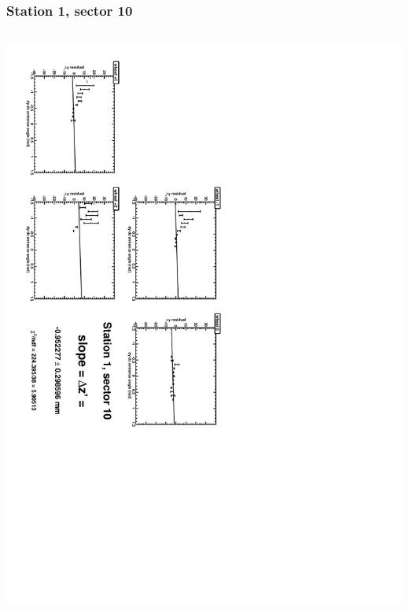 \documentclass[compress]{beamer}
\begin{document}
\begin{frame}
\frametitle{Station 1, sector 10}
\begin{columns}
\includegraphics[height=\linewidth, angle=90]{zfits/zfit_1_10.pdf}


\end{columns}
\end{frame}
\end{document}
